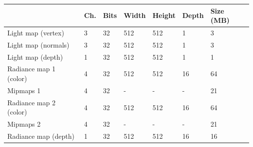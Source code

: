 \begin{table}[!ht]
\centering
\begin{tabular}{p{3cm}lllll|l|}
\cline{2-7}
\multicolumn{1}{l|}{}                        & \multicolumn{1}{l|}{\textbf{Ch.}} & \multicolumn{1}{l|}{\textbf{Bits}} & \multicolumn{1}{l|}{\textbf{Width}} & \multicolumn{1}{l|}{\textbf{Height}} & \textbf{Depth} & \textbf{Size (MB)} \\ \hline
\multicolumn{1}{|l|}{Light map (vertex)}     & \multicolumn{1}{l|}{3}                 & \multicolumn{1}{l|}{32}                      & \multicolumn{1}{l|}{512}            & \multicolumn{1}{l|}{512}             & 1              & 3                  \\ \hline
\multicolumn{1}{|l|}{Light map (normals)}    & \multicolumn{1}{l|}{3}                 & \multicolumn{1}{l|}{32}                      & \multicolumn{1}{l|}{512}            & \multicolumn{1}{l|}{512}             & 1              & 3                  \\ \hline
\multicolumn{1}{|l|}{Light map (depth)}      & \multicolumn{1}{l|}{1}                 & \multicolumn{1}{l|}{32}                      & \multicolumn{1}{l|}{512}            & \multicolumn{1}{l|}{512}             & 1              & 1                  \\ \hline
\multicolumn{1}{|l|}{Radiance map 1 (color)} & \multicolumn{1}{l|}{4}                 & \multicolumn{1}{l|}{32}                      & \multicolumn{1}{l|}{512}            & \multicolumn{1}{l|}{512}             & 16             & 64                 \\ \hline
\multicolumn{1}{|l|}{Mipmaps 1}              & \multicolumn{1}{l|}{4}                 & \multicolumn{1}{l|}{32}                      & \multicolumn{1}{l|}{-}              & \multicolumn{1}{l|}{-}               & -              & 21                 \\ \hline
\multicolumn{1}{|l|}{Radiance map 2 (color)} & \multicolumn{1}{l|}{4}                 & \multicolumn{1}{l|}{32}                      & \multicolumn{1}{l|}{512}            & \multicolumn{1}{l|}{512}             & 16             & 64                 \\ \hline
\multicolumn{1}{|l|}{Mipmaps 2}              & \multicolumn{1}{l|}{4}                 & \multicolumn{1}{l|}{32}                      & \multicolumn{1}{l|}{-}              & \multicolumn{1}{l|}{-}               & -              & 21                 \\ \hline
\multicolumn{1}{|l|}{Radiance map (depth)}   & \multicolumn{1}{l|}{1}                 & \multicolumn{1}{l|}{32}                      & \multicolumn{1}{l|}{512}            & \multicolumn{1}{l|}{512}             & 16             & 16                 \\ \hline

\end{tabular}
\end{table}
